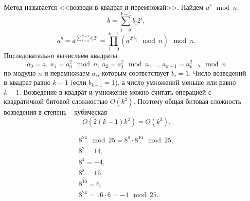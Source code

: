 Метод называется <<возводи в квадрат и перемножай>>. Найдем $a^b \mod n$.
    \[ b = \sum_{i=0}^{k-1} b_i 2^i, \]
    \[ a^b = a^{\sum\limits_{i=0}^{k-1} b_i 2^i} = \prod_{i=0}^{k-1} (a^{{2^i} b_i} \mod n) \mod n. \]
Последовательно вычисляем квадраты
    \[ a_0 = a, ~ a_1 = a_0^2 \mod n, ~ a_2 = a_1^2 \mod n,  \ldots  , ~ a_{k-1} = a_{k-2}^2 \mod n \]
по модулю $n$ и перемножаем $a_i$, которым соответствует $b_i = 1$. Число возведений в квадрат равно $k-1$ (если $b_{k-1} =1$), а число умножений меньше или равно $k-1$. Возведение в квадрат и умножение можно считать операцией с квадратичной битовой сложностью $O(k^2)$. Поэтому общая битовая сложность возведения в степень -- кубическая
    \[ O(2(k-1)k^2) = O(k^3). \]

\example
\[ \begin{array}{l}
    8^{24} \mod 25 = 8^8 \cdot 8^{16} \mod 25, \\
    8^2 = 14, \\
    8^4 = -4, \\
    8^8 = 16, \\
    8^{16} = 6, \\
    8^{24} = 16 \cdot 6 = -4 \mod 25.
\end{array} \]
\exampleend

